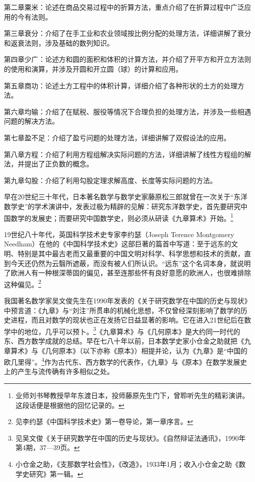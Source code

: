 \documentclass[12pt,UTF8]{ctexbook}
\begin{document}
第二章粟米：论述在商品交易过程中的折算方法，重点介绍了在折算过程中广泛应用的今有法则。

第三章衰分：介绍了在手工业和农业领域按比例分配的处理方法，详细讲解了衰分和返衰法则，涉及基础的数列知识。

第四章少广：论述方和圆的面积和体积的计算方法，并介绍了开平方和开立方法则的使用和演算，并涉及开圆和开立圆（球）的计算和应用。

第五章商功：论述土方工程中的体积计算，详细介绍了各种形状的土方的处理方法。

第六章均输：介绍了在赋税、服役等情况下合理负担的处理方法，并涉及一些相遇问题的解决方法。

第七章盈不足：介绍了盈亏问题的处理方法，详细讲解了双假设法的应用。

第八章方程：介绍了利用方程组解决实际问题的方法，详细讲解了线性方程组的解法，并提出了正负数的概念。

第九章勾股：介绍了利用勾股定理求解高度、长度等实际问题的方法。

早在20世纪三十年代，日本著名数学与数学史家藤原松三郎就曾在一次关于“东洋数学史”的学术演讲中，发表过极为精辟的见解：研究东洋数学史，首先要研究中国数学的发展史；而要研究中国数学史，则必须从研读《九章算术》开始。\footnote{业师刘书琴教授早年东渡日本，投师藤原先生门下，曾聆听先生的精彩演讲。这段话便是根据他的回忆记录的。}

19世纪八十年代，英国科学技术史专家李约瑟（Joseph Terence Montgomery Needham）在他的《中国科学技术史》这部巨著的篇首中写道：至于远东的文明、特别是其中最古老而又最重要的中国文明对科学、科学思想和技术的贡献，直到今天还仍然为云翳所遮蔽，而没有被人们所认识。“远东”这个名词本身，就说明了欧洲人有一种根深蒂固的偏见，甚至连那些怀有良好意愿的欧洲人，也很难排除这种偏见。\footnote{见李约瑟《中国科学技术史》第一卷导论，第一章序言。}

我国著名数学家吴文俊先生在1990年发表的《关于研究数学在中国的历史与现状》中预言道：《九章》与“刘注”所贯串的机械化思想，不仅曾经深刻影响了数学的历史进程，而且对数学的现状也正在发扬它日益显著的影响。它在进入21世纪后在数学中的地位，几乎可以预卜。\footnote{见吴文俊《关于研究数学在中国的历史与现状》。《自然辩证法通讯》，1990年第4期，37—39页。}《九章算术》与《几何原本》是大约同一时代的东、西方数学成就的总结。早在七八十年以前，日本数学史家小仓金之助就把《九章算术》与《几何原本》（以下亦称《原本》）相提并论，认为《九章》是“中国的欧几里得”。\footnote{小仓金之助，《支那数学社会性》，《改造》，1933年1月；收入小仓金之助《数学史研究》第一辑。}作为古代东、西方数学的代表作，《九章》与《原本》在数学发展史上的产生与流传确有许多相似之处。
\end{document}
